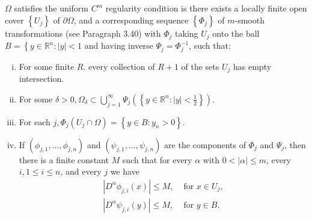 \begin{para}
  $\Omega$ satisfies the uniform $C^m$ regularity condition is there exists a locally finite open cover $\left\{U_j\right\}$ of $\partial\Omega$, and a corresponding sequence $\left\{\Phi_j\right\}$ of $m$-smooth transformations (see Paragraph 3.40) with $\Phi_j$ taking $U_j$ onto the ball $B=\left\{y \in \mathbb{R}^n:|y|<1\right.$ and having inverse $\Psi_j=\Phi_j^{-1}$, such that:
  \begin{enumerate}[(i)]
    \item For some finite $R$. every collection of $R+1$ of the sets $U_j$ has empty intersection.
    \item For some $\delta>0, \Omega_\delta \subset \bigcup_{j=1}^{\infty} \Psi_j\left(\left\{y \in \mathbb{R}^n:|y|<\frac{1}{2}\right\}\right)$.
    \item For each $j, \Phi_j\left(U_j \cap \Omega\right)=\left\{y \in B: y_n>0\right\}$.
    \item If $\left(\phi_{j, 1}, \ldots, \phi_{j, n}\right)$ and $\left(\psi_{j, 1}, \ldots, \psi_{j, n}\right)$ 
      are the components of $\Phi_j$ and $\Psi_j$, then there is a finite constant $M$ such that for every  
      $\alpha$ with $0<|\alpha| \leq m$, every $i, 1 \leq i \leq n$, and every $j$ we have
    \[
    \begin{array}{ll}
    \left|D^\alpha \phi_{j, i}(x)\right| \leq M, & \text { for } x \in U_j, \\
    \left|D^\alpha \psi_{j, i}(y)\right| \leq M, & \text { for } y \in B .
    \end{array}
    \]
  \end{enumerate}
\end{para}


